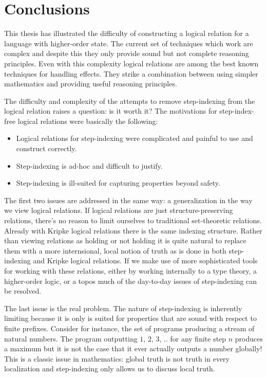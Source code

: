 \section{Conclusions}

This thesis has illustrated the difficulty of constructing a logical
relation for a language with higher-order state. The current set of
techniques which work are complex and despite this they only provide
sound but not complete reasoning principles. Even with this complexity
logical relations are among the best known techniques for handling
effects. They strike a combination between using simpler mathematics
and providing useful reasoning principles.

The difficulty and complexity of the attempts to remove step-indexing
from the logical relation raises a question: is it worth it? The
motivations for step-index-free logical relations were basically the
following:
\begin{itemize}
\item Logical relations for step-indexing were complicated and
  painful to use and construct correctly.
\item Step-indexing is ad-hoc and difficult to justify.
\item Step-indexing is ill-suited for capturing properties beyond
  safety.
\end{itemize}
The first two issues are addressed in the same way: a generalization
in the way we view logical relations. If logical relations are just
structure-preserving relations, there's no reason to limit ourselves
to traditional set-theoretic relations. Already with Kripke logical
relations there is the same indexing structure. Rather than viewing
relations as holding or not holding it is quite natural to replace
them with a more internsional, local notion of truth as is done in
both step-indexing and Kripke logical relations. If we make use of
more sophisticated tools for working with these relations, either by
working internally to a type theory, a higher-order logic, or a topos
much of the day-to-day issues of step-indexing can be resolved.

The last issue is the real problem. The nature of step-indexing is
inherently limiting because it is only is suited for properties that
are sound with respect to finite prefixes. Consider for instance, the
set of programs producing a stream of natural numbers. The program
outputting $1$, $2$, $3$, .. for any finite step $n$ produces a
maximum but it is not the case that it ever actually outputs a number
globally! This is a classic issue in mathematics: global truth is not
truth in every localization and step-indexing only allows us to
discuss local truth.

